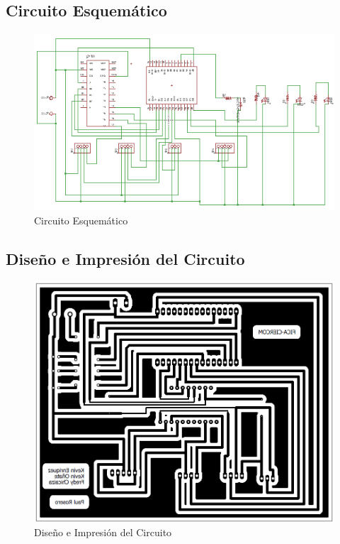 \documentclass[10pt,a4paper]{article}
\begin{document}
\begin{multicols}{2}
\begin{itemize}
\subsection{Circuito Esquemático}
\begin{figure}[H]
\centering
\includegraphics[scale=0.8]{esquematico.PNG}
\caption{Circuito Esquemático}
\end{figure}

\subsection{Diseño e Impresión del Circuito}
\begin{figure}[H]
\centering
\includegraphics[scale=0.4]{placa.PNG}
\caption{Diseño e Impresión del Circuito}
\end{figure}



\end{itemize}
\end{multicols}
\end{document}
